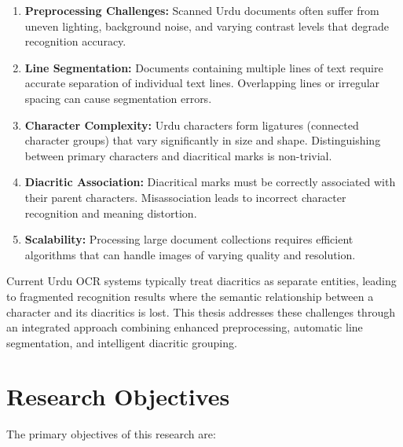 \documentclass[12pt,a4paper,oneside]{report}
\begin{document}
\begin{enumerate}
    \item \textbf{Preprocessing Challenges:} Scanned Urdu documents often suffer from uneven lighting, background noise, and varying contrast levels that degrade recognition accuracy.
    
    \item \textbf{Line Segmentation:} Documents containing multiple lines of text require accurate separation of individual text lines. Overlapping lines or irregular spacing can cause segmentation errors.
    
    \item \textbf{Character Complexity:} Urdu characters form ligatures (connected character groups) that vary significantly in size and shape. Distinguishing between primary characters and diacritical marks is non-trivial.
    
    \item \textbf{Diacritic Association:} Diacritical marks must be correctly associated with their parent characters. Misassociation leads to incorrect character recognition and meaning distortion.
    
    \item \textbf{Scalability:} Processing large document collections requires efficient algorithms that can handle images of varying quality and resolution.
\end{enumerate}

Current Urdu OCR systems typically treat diacritics as separate entities, leading to fragmented recognition results where the semantic relationship between a character and its diacritics is lost. This thesis addresses these challenges through an integrated approach combining enhanced preprocessing, automatic line segmentation, and intelligent diacritic grouping.

\section{Research Objectives}

The primary objectives of this research are:
\end{document}
